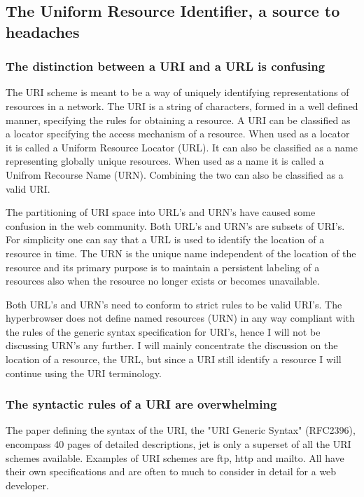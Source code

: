 \documentclass[english]{ifimaster}
\begin{document}
\subsection{The Uniform Resource Identifier, a source to headaches}
\label{sec:URI}
\subsubsection{The distinction between a URI and a URL is confusing}
The URI scheme is meant to be a way of uniquely identifying representations of resources in a network. The URI is a string of characters, formed in a well defined manner, specifying the rules for obtaining a resource. A URI can be classified as a locator specifying the access mechanism of a resource. When used as a locator it is called a Uniform Resource Locator (URL). It can also be classified as a name representing globally unique resources. When used as a name it is called a Unifrom Recourse Name (URN). Combining the two can also be classified as a valid URI\parencite{rfc_URI}.

The partitioning of URI space into URL's and URN's have caused some confusion in the web community\parencite{w3c_URI}. Both URL's and URN's are subsets of URI's. For simplicity one can say that a URL is used to identify the location of a resource in time. The URN is the unique name independent of the location of the resource and its primary purpose is to maintain a persistent labeling of a resources also when the resource no longer exists or becomes unavailable. 

Both URL's and URN's need to conform to strict rules to be valid URI's. The hyperbrowser does not define named resources (URN) in any way compliant with the rules of the generic syntax specification for URI's, hence I will not be discussing URN's any further. I will mainly concentrate the discussion on the location of a resource, the URL, but since a URI still identify a resource I will continue using the URI terminology. 

\subsubsection{The syntactic rules of a URI are overwhelming}
The paper defining the syntax of the URI, the "URI Generic Syntax" (RFC2396), encompass 40 pages of detailed descriptions, jet is only a superset of all the URI schemes available. Examples of URI schemes are ftp, http and mailto. All have their own specifications and are often to much to consider in detail for a web developer. 
\end{document}
